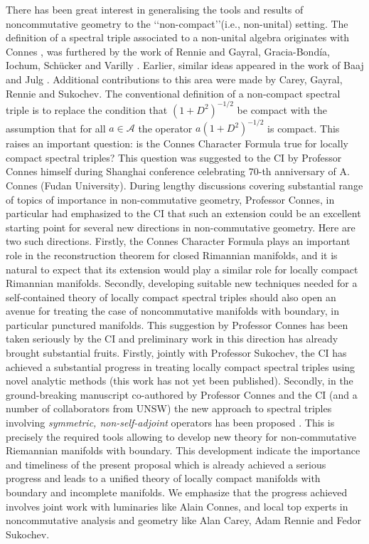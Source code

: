 \documentclass{article}
\begin{document}
There has been great interest in generalising the tools and results of noncommutative geometry to the \lq\lq non-compact\rq\rq (i.e., non-unital) setting. The definition of a spectral triple associated to a non-unital algebra originates with Connes \cite{Connes-reality}, was furthered by the work of Rennie \cite{Rennie}     and Gayral, Gracia-Bond\'ia, Iochum, Sch\"ucker and Varilly \cite{gayral-moyal}. Earlier, similar ideas appeared in the work of Baaj and Julg \cite{Baaj-Julg}. Additional contributions to this area were made by Carey, Gayral, Rennie and Sukochev\cite{CGRS}. The conventional definition  of a non-compact spectral triple is to replace the condition that $(1+D^2)^{-1/2}$ be compact with the assumption that for all $a \in \mathcal{A}$ the operator $a(1+D^2)^{-1/2}$ is compact.
    This raises an important question: is the Connes Character Formula true for locally compact spectral triples? This question was suggested to the CI by Professor Connes himself during Shanghai conference celebrating 70-th anniversary of A. Connes (Fudan University). During lengthy discussions covering substantial range of topics of importance in non-commutative geometry, Professor Connes, in particular had emphasized to the CI that such an extension could be an excellent starting point for several new directions in non-commutative geometry. Here are two such directions. Firstly, the Connes Character Formula plays  an important role in the reconstruction theorem for closed Rimannian manifolds, and it is natural to expect that its extension would play a similar role for locally compact Rimannian manifolds. Secondly, developing suitable new techniques needed for a self-contained theory of locally compact spectral triples should also open an avenue for treating the case of noncommutative manifolds with boundary, in particular punctured manifolds. This suggestion by Professor Connes has been taken seriously by the CI and preliminary work in this direction has already brought substantial fruits. Firstly, jointly with Professor Sukochev, the CI has achieved a substantial progress in treating locally compact spectral triples using novel analytic methods (this work has not yet been published). Secondly, in the ground-breaking manuscript co-authored by Professor Connes and the CI (and a number of collaborators from UNSW) the new approach to spectral triples involving {\it symmetric, non-self-adjoint} operators has been proposed \cite{Connes_team_symmetric}. This is precisely the required tools allowing to develop new theory for non-commutative Riemannian manifolds with boundary. This development indicate the importance and timeliness of the present proposal which is already achieved a serious progress and leads to a unified theory of locally compact manifolds with boundary and incomplete manifolds. We emphasize that the progress achieved involves joint work with luminaries like Alain Connes, and local top experts in noncommutative analysis and geometry like Alan Carey, Adam Rennie and Fedor Sukochev.
    
\end{document}
